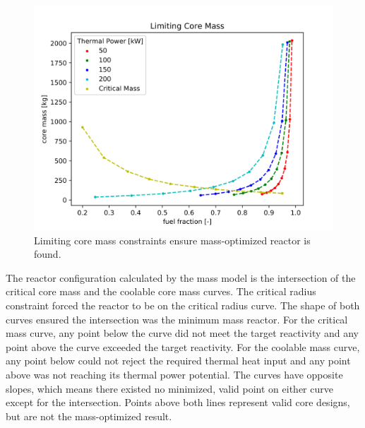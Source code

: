 \begin{figure}[h]
    \centering
    \includegraphics[width=5in]{../images/limiting_core_mass.png}
\caption{Limiting core mass constraints ensure mass-optimized reactor is found.}
\label{fig:limiting_core_mass}
\end{figure}

The reactor configuration calculated by the mass model is the intersection of
the critical core mass and the coolable core mass curves. The critical radius
constraint forced the reactor to be on the critical radius curve. The shape of
both curves ensured the intersection was the minimum mass reactor. For the
critical mass curve, any point below the curve did not meet the target
reactivity and any point above the curve exceeded the target reactivity. For the
coolable mass curve, any point below could not reject the required thermal heat
input and any point above was not reaching its thermal power potential. The
curves have opposite slopes, which means there existed no minimized, valid point on either
curve except for the intersection. Points above both lines represent valid
core designs, but are not the mass-optimized result.


